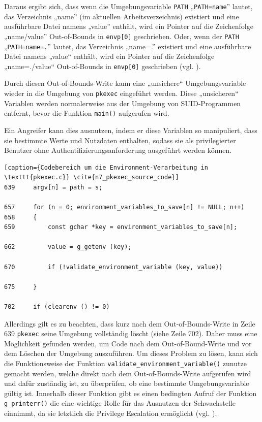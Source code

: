 \documentclass[oneside,11pt,a4paper,article,german]{memoir}
\begin{document}
\par
Daraus ergibt sich, dass wenn die Umgebungsvariable \texttt{PATH} „\texttt{PATH=name}” lautet, das Verzeichnis „name” (im aktuellen Arbeitsverzeichnis)
existiert und eine ausführbare Datei namens „value” enthält, wird ein Pointer auf die Zeichenfolge „name/value” Out-of-Bounds in \texttt{envp[0]} geschrieben. Oder, wenn
der \texttt{PATH} „\texttt{PATH=name=.}” lautet, das Verzeichnis „name=.” existiert und eine ausführbare Datei namens „value“ enthält, wird ein Pointer auf die Zeichenfolge
„name=./value“ Out-of-Bounds in \texttt{envp[0]} geschrieben (vgl. \cite{c16_qualys}).
\par
Durch diesen Out-of-Bounds-Write kann eine „unsichere“ Umgebungsvariable wieder in die Umgebung von \texttt{pkexec} eingeführt
werden. Diese „unsicheren“ Variablen werden normalerweise aus der Umgebung von SUID-Programmen entfernt, bevor die Funktion \texttt{main()} aufgerufen wird.
\par
Ein Angreifer kann dies ausnutzen, indem er diese Variablen so manipuliert, dass sie bestimmte Werte und Nutzdaten enthalten, sodass sie
als privilegierter Benutzer ohne Authentifizierungsanforderung ausgeführt werden können.
\par
\begin{lstlisting}[caption={Codebereich um die Environment-Verarbeitung in \texttt{pkexec.c}} \cite{n7_pkexec_source_code}]
639     argv[n] = path = s;

657     for (n = 0; environment_variables_to_save[n] != NULL; n++)
658     {
659         const gchar *key = environment_variables_to_save[n];

662         value = g_getenv (key);

670         if (!validate_environment_variable (key, value))

675     }

702     if (clearenv () != 0)
\end{lstlisting}

Allerdings gilt es zu beachten, dass kurz nach dem Out-of-Bounds-Write in Zeile 639 \texttt{pkexec} seine Umgebung vollständig löscht
(siehe Zeile 702). Daher muss eine Möglichkeit gefunden werden, um Code nach dem Out-of-Bound-Write und vor dem Löschen der Umgebung auszuführen.
Um dieses Problem zu lösen, kann sich die Funktionsweise der Funktion \texttt{validate\_environment\_variable()}
zunutze gemacht werden, welche direkt nach dem Out-of-Bounds-Write aufgerufen wird und dafür zuständig ist, zu überprüfen, ob eine bestimmte Umgebungsvariable gültig ist\cite{n6_mendio_pwnkit}.
Innerhalb dieser Funktion gibt es einen bedingten Aufruf der Funktion \texttt{g\_printerr()} die eine wichtige Rolle für das Ausnutzen der Schwachstelle
einnimmt, da sie letztlich die Privilege Escalation ermöglicht (vgl. \cite{c16_qualys}).
\par
\end{document}
